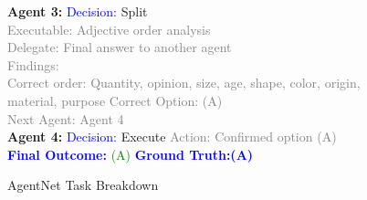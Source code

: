 \documentclass{article}
\begin{document}
\begin{figure}[h]
\begin{minipage}{0.5\textwidth}
{\begin{minipage}[t]{\textwidth}
        \textbf{Agent 3:} \textcolor{blue}{Decision:} Split \\
        \textcolor{gray}{Executable: Adjective order analysis} \\
        \textcolor{gray}{Delegate: Final answer to another agent} \\
        \textcolor{gray}{Findings:}\\ 
        \quad \textcolor{gray}{Correct order: Quantity, opinion, size, age, shape, color, origin, material, purpose} 
        \quad \textcolor{gray}{Correct Option: (A)} \\[0.5ex]
        \textcolor{gray}{Next Agent: Agent 4}\\

        \textbf{Agent 4:} \textcolor{blue}{Decision:} Execute \textcolor{gray}{Action: Confirmed option (A)} \\[0.5ex]

        \textbf{\textcolor{blue}{Final Outcome:}} \textcolor{green}{(A)} \textbf{\textcolor{blue}{\quad \quad \quad \quad \quad \quad \quad \quad \quad Ground Truth:(A)}}
        \end{minipage}}
        \caption{AgentNet Task Breakdown}
    \end{minipage}
\end{figure}
\end{document}
